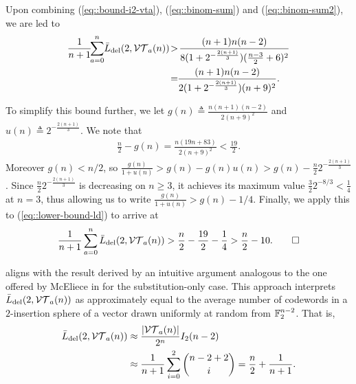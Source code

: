 \documentclass[conference, a4paper]{IEEEtran}
\begin{document}
\begin{IEEEproof}
Upon combining (\ref{eq::bound-i2-vta}), (\ref{eq::binom-sum}) and (\ref{eq::binom-sum2}), we are led to
\begin{align}
    \frac{1}{n+1} \!\! \sum_{a=0}^{n} \! \listdel{2}{\vt{a}{n}} \!
    &> \! \frac{(n+1)n(n-2)}{8(1+2^{-\frac{2(n+1)}{3}})(\frac{n-3}{2}+6)^2} \nonumber \\
    \!&= \!\! \frac{(n+1)n(n-2)}{2(1+2^{-\frac{2(n+1)}{3}})(n+9)^2}.\!\! \label{eq::lower-bound-ld}
\end{align}

To simplify this bound further, we let $g(n) \triangleq \frac{n(n+1)(n-2)}{2(n+9)^2}$ and $u(n) \triangleq 2^{-\frac{2(n+1)}{3}}$. We note that
\begin{align*}
    \frac{n}{2} - g(n) = \frac{n(19n+83)}{2(n+9)^2} < \frac{19}{2}.
\end{align*}
Moreover $g(n) < n/2$, so $\frac{g(n)}{1+u(n)} > g(n) - g(n)u(n) > g(n) - \frac{n}{2}2^{-\frac{2(n+1)}{3}}$. Since $\frac{n}{2}2^{-\frac{2(n+1)}{3}}$ is decreasing on $n \geq 3$, it achieves its maximum value $\frac{3}{2}2^{-8/3} < \frac{1}{4}$ at $n=3$, thus allowing us to write $\frac{g(n)}{1+u(n)} > g(n) - 1/4$. Finally, we apply this to (\ref{eq::lower-bound-ld}) to arrive at
\begin{align*}
    \frac{1}{n+1} \sum_{a=0}^{n} \bar{L}_\mathrm{del}(2,\mathcal{VT}_{a}(n)) > \frac{n}{2} - \frac{19}{2} - \frac{1}{4} > \frac{n}{2} - 10 . \qedhere
\end{align*}
\end{IEEEproof}

\begin{remark}
     aligns with the result derived by an intuitive argument analogous to the one offered by McEliece in \cite{mcelieceAverageListSize2003} for the substitution-only case. This approach interprets $\bar{L}_\mathrm{del}(2,\mathcal{VT}_{a}(n))$ as approximately equal to the average number of codewords in a $2$-insertion sphere of a vector drawn uniformly at random from $\mathbb{F}_2^{n-2}$. That is, 
\begin{align*}
    \bar{L}_\mathrm{del}(2,\mathcal{VT}_{a}(n)) &\approx \frac{|\mathcal{VT}_{a}(n)|}{2^n} I_2(n-2) \\
    &\approx \frac{1}{n+1} \sum_{i=0}^{2} \binom{n-2+2}{i} = \frac{n}{2} + \frac{1}{n+1}.
\end{align*}
\end{remark}



\end{document}
